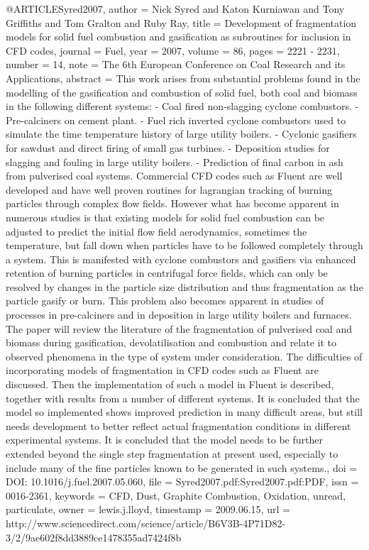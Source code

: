 {{@ARTICLE{Syred2007,
  author = {Nick Syred and Katon Kurniawan and Tony Griffiths and Tom Gralton
	and Ruby Ray},
  title = {Development of fragmentation models for solid fuel combustion and
	gasification as subroutines for inclusion in CFD codes},
  journal = {Fuel},
  year = {2007},
  volume = {86},
  pages = {2221 - 2231},
  number = {14},
  note = {The 6th European Conference on Coal Research and its Applications},
  abstract = {This work arises from substantial problems found in the modelling
	of the gasification and combustion of solid fuel, both coal and biomass
	in the following different systems: - Coal fired non-slagging cyclone
	combustors. - Pre-calciners on cement plant. - Fuel rich inverted
	cyclone combustors used to simulate the time temperature history
	of large utility boilers. - Cyclonic gasifiers for sawdust and direct
	firing of small gas turbines. - Deposition studies for slagging and
	fouling in large utility boilers. - Prediction of final carbon in
	ash from pulverised coal systems. Commercial CFD codes such as Fluent
	are well developed and have well proven routines for lagrangian tracking
	of burning particles through complex flow fields. However what has
	become apparent in numerous studies is that existing models for solid
	fuel combustion can be adjusted to predict the initial flow field
	aerodynamics, sometimes the temperature, but fall down when particles
	have to be followed completely through a system. This is manifested
	with cyclone combustors and gasifiers via enhanced retention of burning
	particles in centrifugal force fields, which can only be resolved
	by changes in the particle size distribution and thus fragmentation
	as the particle gasify or burn. This problem also becomes apparent
	in studies of processes in pre-calciners and in deposition in large
	utility boilers and furnaces. The paper will review the literature
	of the fragmentation of pulverised coal and biomass during gasification,
	devolatilisation and combustion and relate it to observed phenomena
	in the type of system under consideration. The difficulties of incorporating
	models of fragmentation in CFD codes such as Fluent are discussed.
	Then the implementation of such a model in Fluent is described, together
	with results from a number of different systems. It is concluded
	that the model so implemented shows improved prediction in many difficult
	areas, but still needs development to better reflect actual fragmentation
	conditions in different experimental systems. It is concluded that
	the model needs to be further extended beyond the single step fragmentation
	at present used, especially to include many of the fine particles
	known to be generated in such systems.},
  doi = {DOI: 10.1016/j.fuel.2007.05.060},
  file = {Syred2007.pdf:Syred2007.pdf:PDF},
  issn = {0016-2361},
  keywords = {CFD, Dust, Graphite Combustion, Oxidation, unread, particulate},
  owner = {lewis.j.lloyd},
  timestamp = {2009.06.15},
  url = {http://www.sciencedirect.com/science/article/B6V3B-4P71D82-3/2/9ae602f8dd3889ce1478355ad7424f8b}
}

}}
